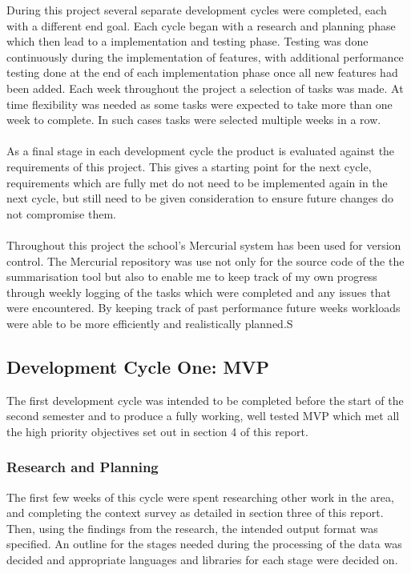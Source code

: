 During this project several separate development cycles were completed, each with a different end goal. Each cycle began with a research and planning phase which then lead to a implementation and testing phase. Testing was done continuously during the implementation of features, with additional performance testing done at the end of each implementation phase once all new features had been added.
Each week throughout the project a selection of tasks was made. At time flexibility was needed as some tasks were expected to take more than one week to complete. In such cases tasks were selected multiple weeks in a row.\\\\
As a final stage in each development cycle the product is evaluated against the requirements of this project. This gives a starting point for the next cycle, requirements which are fully met do not need to be implemented again in the next cycle, but still need to be given consideration to ensure future changes do not compromise them. \\\\
Throughout this project the school's Mercurial system has been used for version control. The Mercurial repository was use not only for the source code of the the summarisation tool but also to enable me to keep track of my own progress through weekly logging of the tasks which were completed and any issues that were encountered. By keeping track of past performance future weeks workloads were able to be more efficiently and realistically planned.S
\subsection{Development Cycle One: MVP}
The first development cycle was intended to be completed before the start of the second semester and to produce a fully working, well tested MVP which met all the high priority objectives set out in section 4 of this report.  
    \subsubsection{Research and Planning}
    The first few weeks of this cycle were spent researching other work in the area, and completing the context survey as detailed in section three of this report. Then, using the findings from the research, the intended output format was specified. An outline for the stages needed during the processing of the data was decided and appropriate languages and libraries for each stage were decided on.
